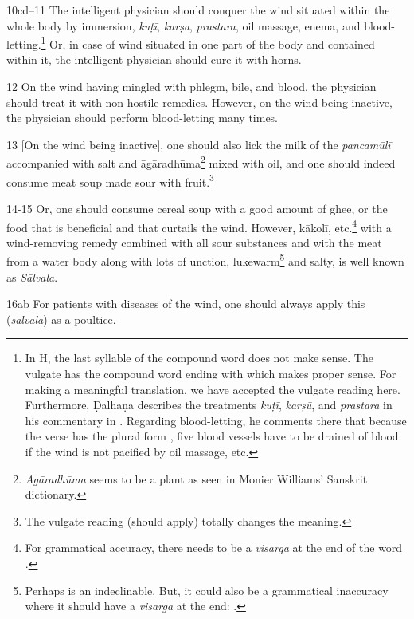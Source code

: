 \begin{translation}
    

    \item[10cd--11]
    The intelligent physician should conquer the wind situated within the whole body by immersion, \textit{kuṭī}, \textit{karṣa}, \textit{prastara}, oil massage, enema, and blood-letting.\footnote{In H, the last syllable  of the compound word does not make sense. The vulgate has the compound word ending with  which makes proper sense. For making a meaningful translation, we have accepted the vulgate reading here. Furthermore, Ḍalhaṇa describes the treatments \textit{kuṭī}, \textit{karṣū}, and \textit{prastara} in his commentary in \citep[421]{vulgate}. Regarding blood-letting, he comments there that because the verse has the plural form , five blood vessels have to be drained of blood if the wind is not pacified by oil massage, etc.} Or, in case of wind situated in one part of the body and contained within it, the intelligent physician should cure it with horns. 

    \item[12]
    On the wind having mingled with phlegm, bile, and blood, the physician should treat it with non-hostile remedies. However, on the wind being inactive, the physician should perform blood-letting many times. 

    \item[13]
    [On the wind being inactive], one should also lick the milk of the \emph{pancamūlī} accompanied with salt and \gls{āgāradhūma}\footnote{\emph{Āgāradhūma} seems to be a plant as seen in Monier Williams' Sanskrit dictionary.} mixed with oil, and one should indeed consume meat soup made sour with fruit.\footnote{The vulgate reading  (should apply) totally changes the meaning.}

    \item[14-15]
    Or, one should consume cereal soup with a good amount of ghee, or the food that is beneficial and that curtails the wind. However, \gls{kākolī}, etc.\footnote{For grammatical accuracy, there needs to be a \emph{visarga} at the end of the word .} with a wind-removing remedy combined with all sour substances and with the meat from a water body along with lots of unction, lukewarm\footnote{Perhaps  is an indeclinable. But, it could also be a grammatical inaccuracy where it should have a \textit{visarga} at the end: .} and salty, is well known as \textit{Sālvala}.    

    \item[16ab]
    For patients with diseases of the wind, one should always apply this (\textit{sālvala}) as a poultice.
    

\end{translation}
